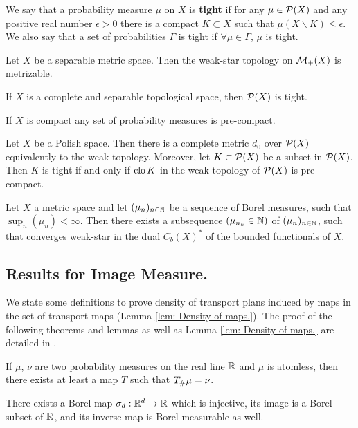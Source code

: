 We say that a probability measure $\mu$ on $X$ is \textbf{tight} if for any $\mu\in \mathcal{P}(X)$ and any positive real number $\epsilon>0$ there is a compact $K\subset X$ such that $\mu(X\backslash K)\leq \epsilon$. We also say that a set of probabilities $\Gamma$ is tight if $\forall \mu \in \Gamma$, $\mu$ is tight.
\begin{theorem}
	Let $X$ be a separable metric space. Then the weak-star
	topology on $\mathcal{M}_+(X)$ is metrizable.
\end{theorem}
\begin{theorem}
	If $X$ is a complete and separable topological space, then $\mathcal{P}(X)$ is tight.
\end{theorem}
If $X$ is compact any set of probability measures is pre-compact.
\begin{theorem}
	Let $X$ be a Polish space. Then there is a complete metric $d_0$ over $\mathcal{P}(X)$ equivalently to the weak topology. Moreover, let $K\subset \mathcal{P}(X)$ be a subset in $\mathcal{P}(X)$. Then $K$ is tight if and only if $\mathrm{clo}\, K$ in the weak topology of $\mathcal{P}(X)$ is pre-compact.
\end{theorem}
\begin{corollary}
	Let $X$ a metric space and let $(\mu_n)_{n\in\mathbb{N}}$ be a sequence of Borel measures, such that $\sup_n(\mu_n)<\infty$. Then there exists a subsequence  $\left( \mu_{n_k}\in \mathbb{N} \right)$ of $(\mu_n)_{n\in\mathbb{N}}$, such that converges weak-star in the dual $C_b(X)^*$ of the bounded functionals of $X$. 
\end{corollary}
\subsection{Results for Image Measure.}
We state some definitions to prove density of transport plans induced by maps in the set of transport maps (Lemma \ref{lem: Density of maps.}). The proof of the following theorems and lemmas as well as Lemma \ref{lem: Density of maps.} are detailed in \cite{Santambrogio2015OT}.

\begin{lemma}
If $\mu$, $\nu$ are two probability measures on the real line $\mathbb{R}$ and $\mu$ is atomless, then there exists at least a map $T$ such that ${T}_{\#} \mu=\nu$.
\end{lemma}
	
\begin{lemma}
There exists a Borel map $\sigma_d: \mathbb{R}^d\rightarrow \mathbb{R}$ which is injective, its image is a Borel subset of $\mathbb{R}$, and its inverse map is Borel measurable as well.
\end{lemma}
		
